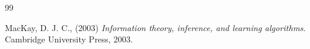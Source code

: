 \documentclass{scrartcl}
\begin{document}
\begin{thebibliography}{99}

  







     MacKay, D. J. C., (2003)
  \textit{Information theory, inference, and learning
  algorithms}. Cambridge University Press, 2003.



\end{thebibliography}
\end{document}
